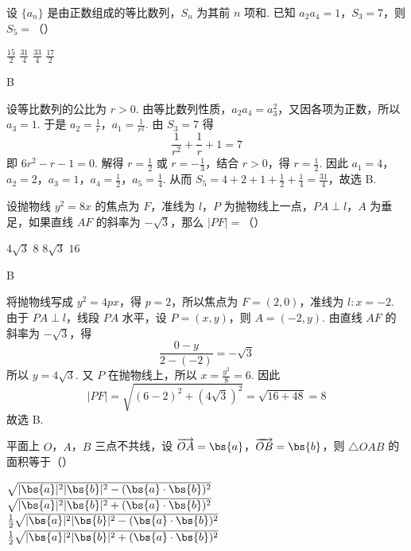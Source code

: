 \begin{problem}
设 \(\{a_{n}\}\) 是由正数组成的等比数列，\(S_{n}\) 为其前 \(n\) 项和. 已知 \(a_{2}a_{4} = 1\)，\(S_{3} = 7\)，则 \(S_{5} =\)（\quad）

\choices
    {\( \frac{15}{2} \)}
    {\( \frac{31}{4} \)}
    {\( \frac{33}{4} \)}
    {\( \frac{17}{2} \)}
\end{problem}

\begin{answer}
B
\end{answer}

\begin{solution}
设等比数列的公比为 \(r>0\). 由等比数列性质，\(a_{2}a_{4}=a_{3}^{2}\)，又因各项为正数，所以 \(a_{3}=1\). 于是
\(a_{2}=\frac{1}{r}\)，\(a_{1}=\frac{1}{r^{2}}\). 由 \(S_{3}=7\) 得
\[
\frac{1}{r^{2}}+\frac{1}{r}+1=7
\]
即 \(6r^{2}-r-1=0\).
解得 \(r=\frac{1}{2}\) 或 \(r=-\frac{1}{3}\)，结合 \(r>0\)，得 \(r=\frac{1}{2}\). 因此
\(a_{1}=4\)，\(a_{2}=2\)，\(a_{3}=1\)，\(a_{4}=\frac{1}{2}\)，\(a_{5}=\frac{1}{4}\).
从而 \(S_{5}=4+2+1+\frac{1}{2}+\frac{1}{4}=\frac{31}{4}\)，故选 B.
\end{solution}

\begin{problem}
设抛物线 \( y^{2} = 8x \) 的焦点为 \(F\)，准线为 \( l \)，\(P\) 为抛物线上一点，\( PA \perp l \)，\(A\) 为垂足，如果直线 \(AF\) 的斜率为 \( -\sqrt{3} \)，那么 \( |PF| = \)（\quad）

\choices
    {\(4\sqrt{3}\)}
    {\(8\)}
    {\( 8\sqrt{3} \)}
    {\(16\)}
\end{problem}

\begin{answer}
B
\end{answer}

\begin{solution}
将抛物线写成 \(y^{2}=4px\)，得 \(p=2\)，所以焦点为 \(F=(2,0)\)，准线为 \(l:x=-2\). 由于 \(PA\perp l\)，线段 \(PA\) 水平，设 \(P=(x,y)\)，则 \(A=(-2,y)\). 由直线 \(AF\) 的斜率为 \(-\sqrt{3}\)，得
\[
\frac{0-y}{2-(-2)}=-\sqrt{3}
\]
所以 \(y=4\sqrt{3}\).
又 \(P\) 在抛物线上，所以 \(x=\frac{y^{2}}{8}=6\). 因此
\[
|PF|=\sqrt{(6-2)^{2}+(4\sqrt{3})^{2}}=\sqrt{16+48}=8
\]
故选 B.
\end{solution}

\begin{problem}
平面上 \(O\)，\(A\)，\(B\) 三点不共线，设 \(\overrightarrow{OA} = \bs{a}\)，\(\overrightarrow{OB} = \bs{b}\)，则 \(\triangle OAB\) 的面积等于（\quad）

\choices
    {\(\sqrt{|\bs{a}|^2|\bs{b}|^2 - (\bs{a} \cdot \bs{b})^2}\)}
    {\(\sqrt{|\bs{a}|^2|\bs{b}|^2 + (\bs{a} \cdot \bs{b})^2}\)}
    {\(\frac{1}{2}\sqrt{|\bs{a}|^2|\bs{b}|^2 - (\bs{a} \cdot \bs{b})^2}\)}
    {\(\frac{1}{2}\sqrt{|\bs{a}|^2|\bs{b}|^2 + (\bs{a} \cdot \bs{b})^2}\)}
\end{problem}

